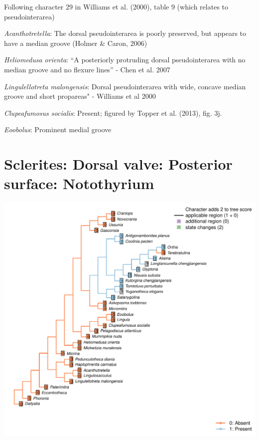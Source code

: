 \documentclass[]{book}
\theoremstyle{definition}
\theoremstyle{definition}
\theoremstyle{definition}
\theoremstyle{remark}
\begin{document}
Following character 29 in Williams et al. (2000), table 9 (which relates
to pseudointerarea)

\emph{Acanthotretella}: The dorsal pseudointerarea is poorly preserved,
but appears to have a median groove (Holmer \& Caron, 2006)

\emph{Heliomedusa orienta}: ``A posteriorly protruding dorsal
pseudointerarea with no median groove and no flexure lines'' - Chen et
al. 2007

\emph{Lingulellotreta malongensis}: Dorsal pseudointerarea with wide,
concave median groove and short propareas" - Williams et al 2000

\emph{Clupeafumosus socialis}: Present; figured by Topper et al. (2013),
fig. 3j.

\emph{Eoobolus}: Prominent medial groove

\hypertarget{sclerites-dorsal-valve-posterior-surface-notothyrium}{%
\section*{Sclerites: Dorsal valve: Posterior surface:
Notothyrium}\label{sclerites-dorsal-valve-posterior-surface-notothyrium}}

\includegraphics{Brachiopod_phylogeny_files/figure-latex/unnamed-chunk-5-23.pdf}
\end{document}

